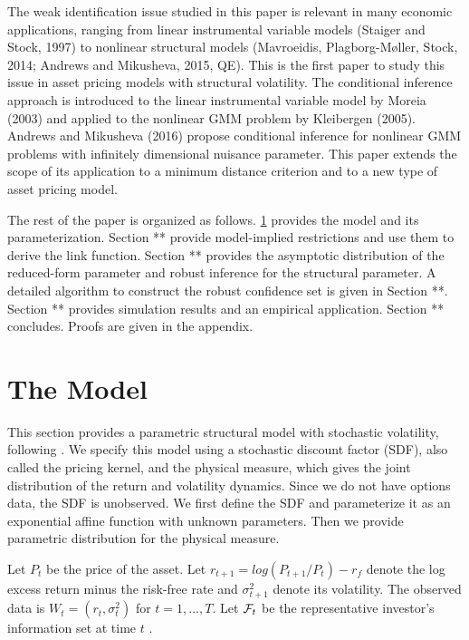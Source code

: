\documentclass[11pt, letterpaper, twoside]{article}
\begin{document}
The weak identification issue studied in this paper is relevant in many economic applications, ranging from linear instrumental variable models (Staiger and Stock, 1997) to nonlinear structural models (Mavroeidis, Plagborg-Møller, Stock, 2014; Andrews and Mikusheva, 2015, QE). This is the first paper to study this issue in asset pricing models with structural volatility. The conditional inference approach is introduced to the linear instrumental variable model by Moreia (2003) and applied to the nonlinear GMM problem by Kleibergen (2005). Andrews and Mikusheva (2016) propose conditional inference for nonlinear GMM problems with infinitely dimensional nuisance parameter. This paper extends the scope of its application to a minimum distance criterion and to a new type of asset pricing model.

The rest of the paper is organized as follows. \cref{sec:model} provides the model and its parameterization. Section ** provide model-implied restrictions and use them to derive the link function. Section ** provides the asymptotic distribution of the reduced-form parameter and robust inference for the structural parameter. A detailed algorithm to construct the robust confidence set is given in Section **. Section ** provides simulation results and an empirical application. Section ** concludes. Proofs are given in the appendix.

\section{The Model}\label{sec:model}


This section provides a parametric structural model with stochastic volatility, following \textcite{han2018leverage}. We specify this model using a stochastic discount factor (SDF), also called the pricing kernel, and the physical measure, which gives the joint distribution of the return and volatility dynamics. Since we do not have options data, the SDF is unobserved. We first define the SDF and parameterize it as an exponential affine function with unknown parameters. Then we provide parametric distribution for the physical measure. 

  
Let $P_t$ be the price of the asset. Let $r_{t+1}=log(P_{t+1}/P_t)-r_f$ denote the log excess return minus the risk-free rate and $\sigma^2_{t+1}$ denote its volatility. The observed data is $W_t=(r_t,\sigma^2_{t})$ for $t=1,...,T$. 
Let $\mathcal{F}_t$ be the representative investor's information set at time $t$ . 
\end{document}
